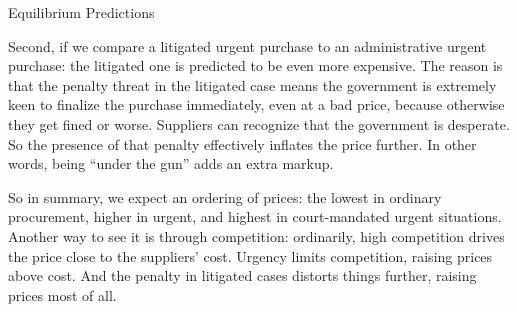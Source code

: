 \documentclass[aspectratio=169]{beamer}
\begin{document}
\begin{frame}{Equilibrium Predictions}
{Second, if we compare a litigated urgent purchase to an administrative urgent purchase: the litigated one is predicted to be even more expensive. The reason is that the penalty threat in the litigated case means the government is extremely keen to finalize the purchase immediately, even at a bad price, because otherwise they get fined or worse. Suppliers can recognize that the government is desperate. So the presence of that penalty effectively inflates the price further. In other words, being ``under the gun'' adds an extra markup.

So in summary, we expect an ordering of prices: the lowest in ordinary procurement, higher in urgent, and highest in court-mandated urgent situations. Another way to see it is through competition: ordinarily, high competition drives the price close to the suppliers' cost. Urgency limits competition, raising prices above cost. And the penalty in litigated cases distorts things further, raising prices most of all.}
\end{frame}
\end{document}
